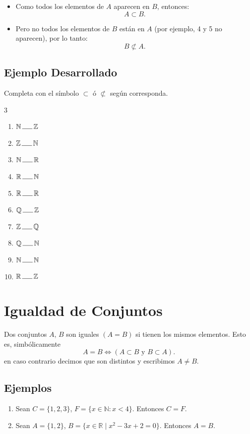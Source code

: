 \documentclass[12pt]{article}
\begin{document}
\begin{itemize}
    \item Como todos los elementos de \(A\) aparecen en \(B\), entonces:  
    \[
    A \subset B.
    \]

    \item Pero no todos los elementos de \(B\) están en \(A\) (por ejemplo, 4 y 5 no aparecen), por lo tanto:  
    \[
    B \not\subset A.
    \]

\end{itemize}

\subsection*{Ejemplo Desarrollado}


Completa con el símbolo $ \subset$ ó $\not\subset$ según corresponda.

\begin{multicols}{3}
    \begin{enumerate}
    \item $\mathbb{N}\,\line(1,0){15}\,  \mathbb{Z}$
    \item $\mathbb{Z}\,\line(1,0){15}\,  \mathbb{N}$
    \item $\mathbb{N}\,\line(1,0){15}\,  \mathbb{R}$
    \item $\mathbb{R}\,\line(1,0){15}\,  \mathbb{N}$
    \item $\mathbb{R}\,\line(1,0){15}\,  \mathbb{R}$
    \item $\mathbb{Q}\,\line(1,0){15}\,  \mathbb{Z}$
    \item $\mathbb{Z}\,\line(1,0){15}\,  \mathbb{Q}$
    \item $\mathbb{Q}\,\line(1,0){15}\,  \mathbb{N}$
    \item $\mathbb{N}\,\line(1,0){15}\,  \mathbb{N}$
    \item $\mathbb{R}\,\line(1,0){15}\,  \mathbb{Z}$
\end{enumerate}
\end{multicols}
\section{Igualdad de Conjuntos}
Dos conjuntos $A$, $ B$ son iguales $(A=B)$ si tienen los mismos elementos. Esto es, simbólicamente
$$A=B \Longleftrightarrow (A\subset B \text{ y } B\subset A).$$
en caso contrario decimos que son distintos y escribimos $A\neq B.$

\subsection*{Ejemplos}
\begin{enumerate}
    \item  Sean $C = \{ 1, 2, 3\}$, $F = \{x\in \mathbb{N}: x < 4\}$. Entonces  $C=F$.
    \item Sean $ A = \{1, 2\} $, 
$ B = \{x \in \mathbb{R} \mid x^2 - 3x + 2 = 0\} $. Entonces $A=B$.
\end{enumerate}
\end{document}
